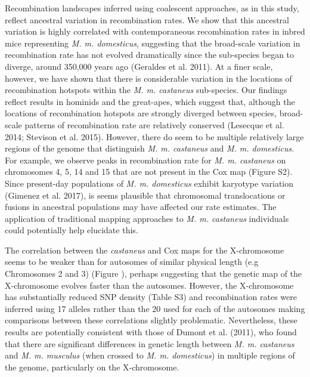 Recombination landscapes inferred using coalescent approaches, as in this study, reflect ancestral variation in recombination rates. We show that this ancestral variation is highly correlated with contemporaneous recombination rates in inbred mice representing \emph{M. m. domesticus}, suggesting that the broad-scale variation in recombination rate has not evolved dramatically since the sub-species began to diverge, around 350,000 years ago (Geraldes et al. 2011). At a finer scale, however, we have shown that there is considerable variation in the locations of recombination hotspots within the \textit{M. m. castaneus} sub-species. Our findings reflect results in hominids and the great-apes, which suggest that, although the locations of recombination hotspots are strongly diverged between species, broad-scale patterns of recombination rate are relatively conserved (Lesecque et al. 2014; Stevison et al. 2015). However, there do seem to be multiple relatively large regions of the genome that distinguish \textit{M. m. castaneus} and \emph{M. m. domesticus}. For example, we observe peaks in recombination rate for \emph{M. m. castaneus} on chromosomes 4, 5, 14 and 15 that are not present in the Cox map (Figure S2). Since present-day populations of \emph{M. m. domesticus} exhibit karyotype variation (Gimenez et al. 2017), is seems plausible that chromosomal translocations or fusions in ancestral populations may have affected our rate estimates. The application of traditional mapping approaches to \emph{M. m. castaneus} individuals could potentially help elucidate this.

The correlation between the \textit{castaneus} and Cox maps for the X-chromosome seems to be weaker than for autosomes of similar physical length (e.g Chromosomes 2 and 3) (Figure ), perhaps suggesting that the genetic map of the X-chromosome evolves faster than the autosomes. However, the X-chromosome has substantially reduced SNP density (Table S3) and recombination rates were inferred using 17 alleles rather than the 20 used for each of the autosomes making comparisons between these correlations slightly problematic. Nevertheless, these results are potentially consistent with those of Dumont et al. (2011), who found that there are significant differences in genetic length between \emph{M. m. castaneus} and \emph{M. m. musculus} (when crossed to \emph{M. m. domesticus}) in multiple regions of the genome, particularly on the X-chromosome.

